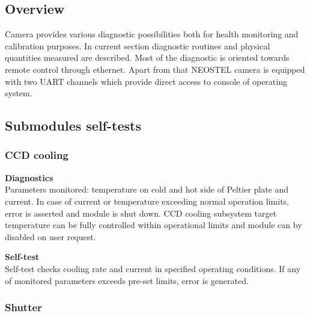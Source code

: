 \subsection{Overview}
Camera provides various diagnostic possibilities both for health monitoring and calibration purposes. In current section diagnostic routines and physical quantities measured are described. Most of the diagnostic is oriented towards remote control through ethernet. Apart from that NEOSTEL camera is equipped with two UART channels which provide direct access to console of operating system.

\subsection{Submodules self-tests}

\subsubsection{CCD cooling}

\begin{description}
\item \textbf{Diagnostics} \hfill \\
Parameters monitored: temperature on cold and hot side of Peltier plate and current. In case of current or temperature exceeding normal operation limits, error is asserted and module is shut down. CCD cooling subsystem target temperature can be fully controlled within operational limits and module can by disabled on user request. 

\item \textbf{Self-test} \hfill \\
Self-test checks cooling rate and current in specified operating conditions. If any of monitored parameters exceeds pre-set limits, error is generated.
\end{description}

\subsubsection{Shutter}

